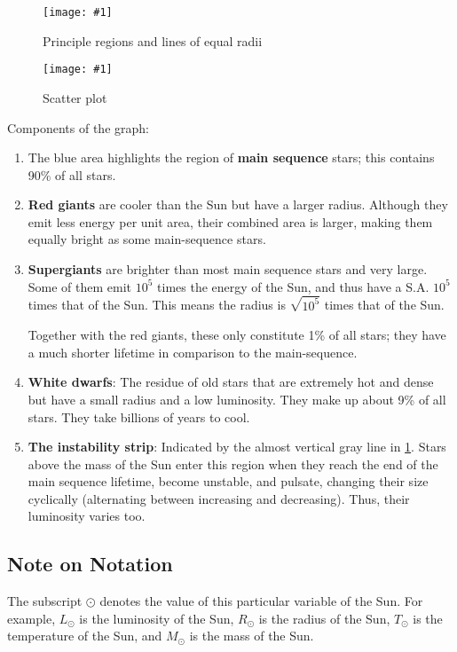 \documentclass[a4paper,12pt]{article}
\newcommand{\img}[4]{\begin{center}
  \begin{figure}[H]
    \centering
    \texttt{[image: \#1]}
    \caption{#3}
    \label{fig:#4}
  \end{figure}
\end{center}}
\begin{document}
\begin{minipage}{0.5\textwidth}
  \img{hr1.png}{1}{Principle regions and lines of equal radii}{HR}
\end{minipage}%
\begin{minipage}{0.5\textwidth}
  \img{hr2.png}{1}{Scatter plot}{HR2}
\end{minipage}%

\pagebreak

Components of the graph:
\begin{enumerate}
  \item The blue area highlights the region of \textbf{main sequence} stars; this contains 90\% of all stars.
  \item \textbf{Red giants} are cooler than the Sun but have a larger radius. Although they emit less energy per unit area, their combined area is larger, making them equally bright as some main-sequence stars.
  \item \textbf{Supergiants} are brighter than most main sequence stars and very large. Some of them emit $10^5$ times the energy of the Sun, and thus have a S.A. $10^5$ times that of the Sun. This means the radius is $\sqrt{10^5}$ times that of the Sun.

        Together with the red giants, these only constitute 1\% of all stars; they have a much shorter lifetime in comparison to the main-sequence.
  \item \textbf{White dwarfs}: The residue of old stars that are extremely hot and dense but have a small radius and a low luminosity. They make up about 9\% of all stars. They take billions of years to cool.
  \item \textbf{The instability strip}: Indicated by the almost vertical gray line in \cref{fig:HR}. Stars above the mass of the Sun enter this region when they reach the end of the main sequence lifetime, become unstable, and pulsate, changing their size cyclically (alternating between increasing and decreasing). Thus, their luminosity varies too.
\end{enumerate}

\subsection{Note on Notation}

The subscript $\odot$ denotes the value of this particular variable of the Sun. For example, $L_{\odot}$ is the luminosity of the Sun, $R_{\odot}$ is the radius of the Sun, $T_{\odot}$ is the temperature of the Sun, and $M_{\odot}$ is the mass of the Sun.
\end{document}

